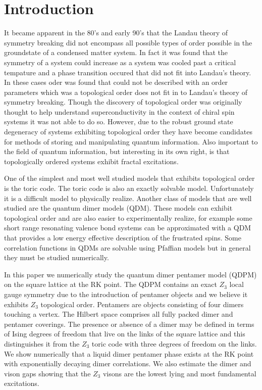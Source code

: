 \documentclass[aps,floatfix,11pt,twocolumn]{revtex4-1}
\begin{document}
\section{Introduction}

    It became apparent in the 80's and early 90's that the Landau theory of symmetry breaking did not
    encompass all possible types of order possible in the groundstate of a condensed matter system. 
    In fact it was found that the symmetry of a system
    could increase as a system was cooled past a critical tempature and a phase transition occured
    that did not fit into Landau's theory. In these cases oder was found
    that could not be described with an order
    parameters \cite{wen_1990} which was a topological order does not fit in to Landau's
    theory of symmetry breaking. Though the discovery of topological order was originally thought
    to help understand superconductivity in the context of chiral spin systems \cite{HERE} it was
    not able to do so. However, due to the robust ground state degeneracy of systems exhibiting
    topological order they have become candidates for methods of storing and manipulating
    quantum information.  Also important to the field of quantum information, but interesting in
    its own right, is that topologically ordered systems exhibit fractal excitations. 

    One of the simplest and most well studied models that exhibits topological order is the
    toric code. The toric code is also an exactly solvable model. Unfortunately it is
    a difficult model to physically realize. Another class of models that are well studied are
    the quantum dimer models (QDM).  These models can exhibit topological order and are also
    easier to experimentally realize, for example some short range resonating valence bond
    systems can be approximated with a QDM that provides a low energy effective description of
    the frustrated spins. Some correlation functions in QDMs are solvable using Pfaffian models
    but in general they must be studied numerically. 

    In this paper we numerically study the quantum dimer pentamer model (QDPM) on the square
    lattice at the RK point.  The QDPM contains an exact $Z_3$ local gauge symmetry due to the
    introduction of pentamer objects and we believe it exhibits $Z_3$ topological order.
    Pentamers are objects consisting of four dimers touching a vertex.  The Hilbert space
    comprises all fully packed dimer and pentamer coverings. The presence or absence of a dimer
    may be defined in terms of Ising degrees of freedom that live on the links of the square
    lattice and this distinguishes it from the $Z_3$ toric code with three degrees of freedom on
    the links. We show numerically that a liquid dimer pentamer phase exists at the RK point
    with exponentially decaying dimer correlations. We also estimate the dimer and vison gaps
    showing that the $Z_3$ visons are the lowest lying and most fundamental excitations.
\end{document}
